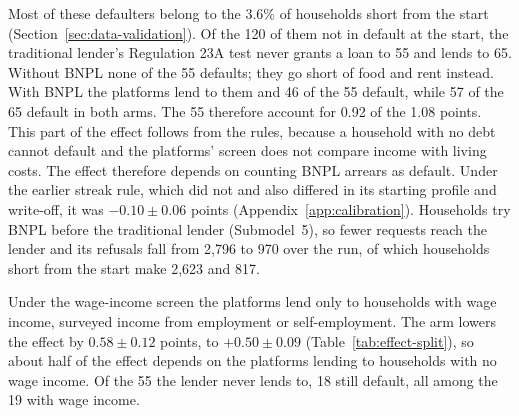 Most of these defaulters belong to the 3.6\% of households short from the start
(Section~\ref{sec:data-validation}). Of the 120 of them not in default at the start, the
traditional lender's Regulation 23A test never grants a loan to 55 and lends to 65. Without
\ac{BNPL} none of the 55 defaults; they go short of food and rent
instead. With \ac{BNPL} the platforms lend to them and 46 of the 55 default, while 57 of the 65
default in both arms. The 55 therefore account for 0.92 of the 1.08 points. This part of the
effect follows from the rules, because a household with no debt cannot default and the platforms'
screen does not compare income with living costs. The effect therefore depends on counting
\ac{BNPL} arrears as default. Under the earlier streak rule, which did not and also differed in its
starting profile and write-off, it was $-0.10 \pm 0.06$ points (Appendix~\ref{app:calibration}).
Households try \ac{BNPL} before the traditional lender
(Submodel~5), so fewer requests reach the lender and its refusals fall from 2{,}796 to 970 over the
run, of which households short from the start make 2{,}623 and 817.

Under the wage-income screen the platforms lend only to households with wage income, surveyed
income from employment or self-employment. The arm lowers the effect by $0.58 \pm 0.12$ points, to
$+0.50 \pm 0.09$ (Table~\ref{tab:effect-split}), so about half of the effect depends on the
platforms lending to households with no wage income. Of the 55 the lender never lends to, 18
still default, all among the 19 with wage income.

